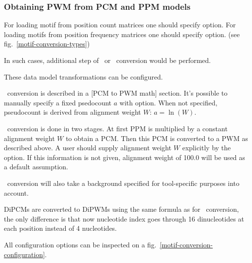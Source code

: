 \subsubsection{Obtaining PWM from PCM and PPM models}
For loading motif from position count matrices one should specify  option. For loading motifs from position frequency matrices one should specify  option. (see fig.~\ref{motif-conversion-types})

In such cases, additional step of \PcmToPwm\ or \PpmToPwm\ conversion would be performed.

These data model transformations can be configured.

\PcmToPwm\ conversion is described in a [PCM to PWM math] section. It's possible to manually specify a fixed psedocount $a$ with  option. When not specified, pseudocount is derived from alignment weight $W$: $a =\ln(W)$.

\PpmToPwm\ conversion is done in two stages. At first PPM is multiplied by a constant alignment weight $W$ to obtain a PCM. Then this PCM is converted to a PWM as described above.
A user should supply alignment weight $W$ explicitly by the  option. If this information is not given, alignment weight of 100.0 will be used as a default assumption.

\PcmToPwm\ conversion will also take a background specified for tool-specific purposes into account.

DiPCMs are converted to DiPWMs using the same formula as for \PcmToPwm\ conversion, the only difference is that now nucleotide index goes through 16 dinucleotides at each position instead of 4 nucleotides.

All configuration options can be inspected on a fig.~\ref{motif-conversion-configuration}.
